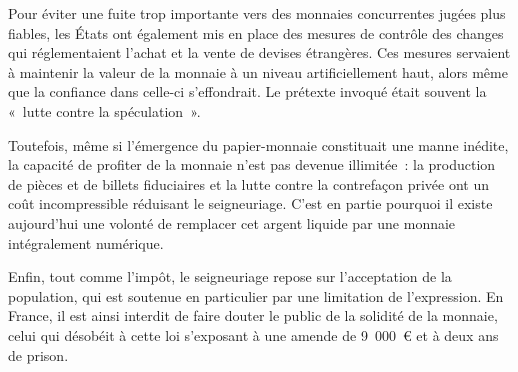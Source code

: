 
Pour éviter une fuite trop importante vers des monnaies concurrentes jugées plus fiables, les États ont également mis en place des mesures de contrôle des changes qui réglementaient l'achat et la vente de devises étrangères. Ces mesures servaient à maintenir la valeur de la monnaie à un niveau artificiellement haut, alors même que la confiance dans celle-ci s'effondrait. Le prétexte invoqué était souvent la «~lutte contre la spéculation~».

Toutefois, même si l'émergence du papier-monnaie constituait une manne inédite, la capacité de profiter de la monnaie n'est pas devenue illimitée~: la production de pièces et de billets fiduciaires et la lutte contre la contrefaçon privée ont un coût incompressible réduisant le seigneuriage. C'est en partie pourquoi il existe aujourd'hui une volonté de remplacer cet argent liquide par une monnaie intégralement numérique.


Enfin, tout comme l'impôt, le seigneuriage repose sur l'acceptation de la population, qui est soutenue en particulier par une limitation de l'expression. En France, il est ainsi interdit de faire douter le public de la solidité de la monnaie, celui qui désobéit à cette loi s'exposant à une amende de 9~000~\euro{} et à deux ans de prison. %

